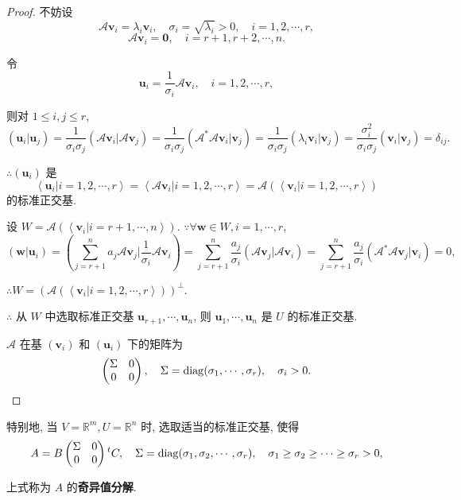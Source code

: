 \documentclass[color=black,device=normal,lang=cn,mode=geye]{elegantnote}
\begin{document}
\begin{proof}
    不妨设
    \[\mathcal{A}\boldsymbol{v}_i=\lambda_i\boldsymbol{v}_i,\quad\sigma_i=\sqrt{\lambda_i}>0,\quad i=1,2,\cdots,r,\]
    \[\mathcal{A}\boldsymbol{v}_i=\boldsymbol{0},\quad i=r+1,r+2,\cdots,n.\]

    令
    \[\boldsymbol{u}_i=\dfrac{1}{\sigma_i}\mathcal{A}\boldsymbol{v}_i,\quad i=1,2,\cdots,r,\]

    则对 $1\leq i,j\leq r$,
    \[(\boldsymbol{u}_i|\boldsymbol{u}_j)=\dfrac{1}{\sigma_i\sigma_j}(\mathcal{A}\boldsymbol{v}_i|\mathcal{A}\boldsymbol{v}_j)=\dfrac{1}{\sigma_i\sigma_j}(\mathcal{A}^*\mathcal{A}\boldsymbol{v}_i|\boldsymbol{v}_j)=\dfrac{1}{\sigma_i\sigma_j}(\lambda_i\boldsymbol{v}_i|\boldsymbol{v}_j)=\dfrac{\sigma_i^2}{\sigma_i\sigma_j}(\boldsymbol{v}_i|\boldsymbol{v}_j)=\delta_{ij}.\]

    $\therefore(\boldsymbol{u}_i)$ 是
    \[\left<\boldsymbol{u}_i|i=1,2,\cdots,r\right>=\left<\mathcal{A}\boldsymbol{v}_i|i=1,2,\cdots,r\right>=\mathcal{A}(\left<\boldsymbol{v}_i|i=1,2,\cdots,r\right>)\]
    的标准正交基.

    设 $W=\mathcal{A}(\left<\boldsymbol{v}_i|i=r+1,\cdots,n\right>)$. $\because\forall\boldsymbol{w}\in W,i=1,\cdots,r$,
    \[(\boldsymbol{w}|\boldsymbol{u}_i)=\left(\sum\limits_{j=r+1}^na_j\mathcal{A}\boldsymbol{v}_j\Bigg|\dfrac{1}{\sigma_i}\mathcal{A}\boldsymbol{v}_i\right)=\sum\limits_{j=r+1}^n\dfrac{a_j}{\sigma_i}(\mathcal{A}\boldsymbol{v}_j|\mathcal{A}\boldsymbol{v}_i)=\sum\limits_{j=r+1}^n\dfrac{a_j}{\sigma_i}(\mathcal{A}^*\mathcal{A}\boldsymbol{v}_j|\boldsymbol{v}_i)=0,\]

    $\therefore W=(\mathcal{A}(\left<\boldsymbol{v}_i|i=1,2,\cdots,r\right>))^\perp$.
    
    $\therefore$ 从 $W$ 中选取标准正交基 $\boldsymbol{u}_{r+1},\cdots,\boldsymbol{u}_n$, 则 $\boldsymbol{u}_1,\cdots,\boldsymbol{u}_n$ 是 $U$ 的标准正交基.

    $\mathcal{A}$ 在基 $(\boldsymbol{v}_i)$ 和 $(\boldsymbol{u}_i)$ 下的矩阵为
    \[\begin{pmatrix}
        \Sigma & 0 \\
        0 & 0 \\
    \end{pmatrix},\quad\Sigma=\operatorname{diag} (\sigma_1,\cdots,\sigma_r),\quad\sigma_i>0.\qedhere\]
\end{proof}
\begin{note}
    特别地, 当 $V=\mathbb{R}^m,U=\mathbb{R}^n$ 时, 选取适当的标准正交基, 使得
    \[A=B\begin{pmatrix}
        \Sigma & 0 \\
        0 & 0 \\
    \end{pmatrix}{}^tC,\quad\Sigma=\operatorname{diag} (\sigma_1,\sigma_2,\cdots,\sigma_r),\quad \sigma_1\geq\sigma_2\geq\cdots\geq\sigma_r>0,\]

    上式称为 $A$ 的\textbf{奇异值分解}.
\end{note}
\end{document}
